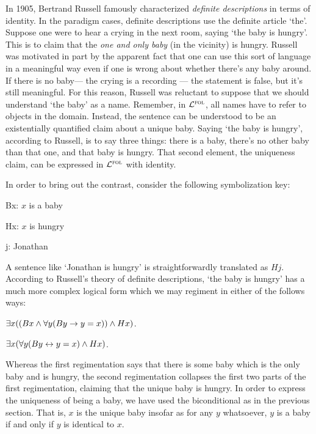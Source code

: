 In 1905, Bertrand Russell famously characterized \emph{definite descriptions} in terms of identity.
In the paradigm cases, definite descriptions use the definite article `the'.
Suppose one were to hear a crying in the next room, saying `the baby is hungry'.
This is to claim that the \emph{one and only baby} (in the vicinity) is hungry.
Russell was motivated in part by the apparent fact that one can use this sort of language in a meaningful way even if one is wrong about whether there's any baby around.
If there is no baby--- the crying is a recording --- the statement is false, but it's still meaningful.
For this reason, Russell was reluctant to suppose that we should understand `the baby' as a name.
Remember, in $\mathcal{L}^{\textsc{fol}}$, all names have to refer to objects in the domain.
Instead, the sentence can be understood to be an existentially quantified claim about a unique baby.
Saying `the baby is hungry', according to Russell, is to say three things: there is a baby, there's no other baby than that one, and that baby is hungry.
That second element, the uniqueness claim, can be expressed in $\mathcal{L}^{\textsc{fol}}$ with identity. 

In order to bring out the contrast, consider the following symbolization key:

\begin{ekey}
  \item[Bx:] $x$ is a baby
  \item[Hx:] $x$ is hungry
  \item[j:] Jonathan
\end{ekey}

A sentence like `Jonathan is hungry' is straightforwardly translated as $Hj$.
According to Russell's theory of definite descriptions, `the baby is hungry' has a much more complex logical form which we may regiment in either of the follows ways:

\begin{earg}
  \item[\ex{Def1}] $\exists x ((Bx \wedge \forall y (By \rightarrow y = x)) \wedge Hx)$.
  \item[\ex{Def2}] $\exists x (\forall y (By \leftrightarrow y = x) \wedge Hx)$.
\end{earg}

Whereas the first regimentation says that there is some baby which is the only baby and is hungry, the second regimentation collapses the first two parts of the first regimentation, claiming that the unique baby is hungry.
In order to express the uniqueness of being a baby, we have used the biconditional as in the previous section.
That is, $x$ is the unique baby insofar as for any $y$ whatsoever, $y$ is a baby if and only if $y$ is identical to $x$.

